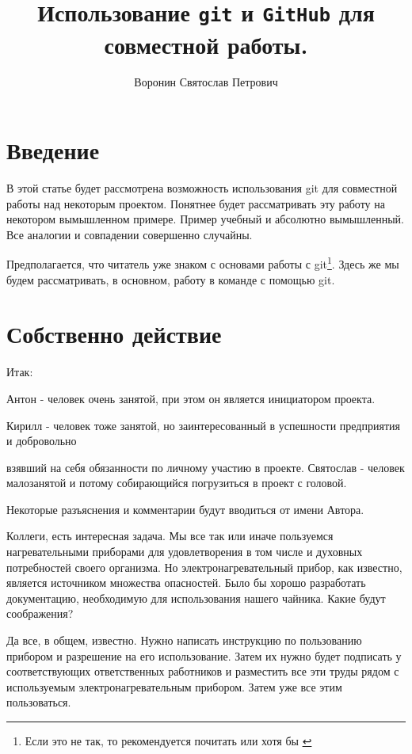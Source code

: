 \documentclass[14pt,a4paper]{article}
\author{Воронин Святослав Петрович}
\title{Использование \texttt{git} и \texttt{GitHub} для совместной работы.}
\begin{document}
\maketitle
\tableofcontents

\section{Введение}
В этой статье будет рассмотрена возможность использования git для совместной работы над 
некоторым проектом. Понятнее будет рассматривать эту работу на некотором вымышленном примере. 
Пример учебный и абсолютно вымышленный. Все аналогии и совпадении совершенно случайны.

Предполагается, что читатель уже знаком с основами работы с git\footnote{Если это не так, то 
рекомендуется почитать \cite{bib:chakon} или хотя бы \cite{bib:svyat-local-git}}. Здесь же мы
будем рассматривать, в основном, работу в команде с помощью git.

\section{Собственно действие}
Итак:


Антон - человек очень занятой, при этом он является инициатором проекта.\par
Кирилл - человек тоже занятой, но заинтересованный в успешности предприятия и добровольно\par
взявший на себя обязанности по личному участию в проекте.
Святослав - человек малозанятой и потому собирающийся погрузиться в проект с головой.\par
Некоторые разъяснения и комментарии будут вводиться от имени Автора.
\newpage


 Коллеги, есть интересная задача. Мы все так или иначе пользуемся нагревательными приборами
для удовлетворения в том числе и духовных потребностей своего организма. Но электронагревательный 
прибор, как известно, является источником множества опасностей. Было бы хорошо разработать
документацию, необходимую для использования нашего чайника. Какие будут соображения?

 Да все, в общем, известно. Нужно написать инструкцию по пользованию прибором и разрешение
на его использование. 
Затем их нужно будет подписать у соответствующих ответственных работников и разместить все эти труды
рядом с используемым электронагревательным прибором. Затем уже все этим пользоваться. 
\end{document}
